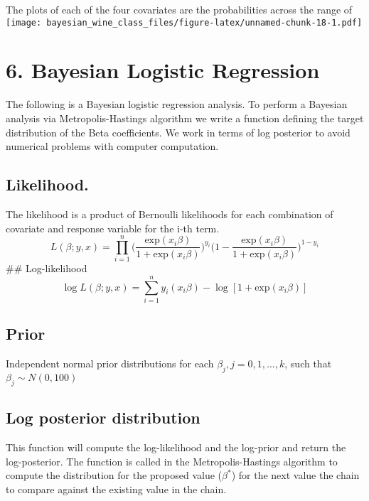 \documentclass[
]{article}
\begin{document}
The plots of each of the four covariates are the probabilities across
the range of
\texttt{[image: bayesian\_wine\_class\_files/figure-latex/unnamed-chunk-18-1.pdf]}

\hypertarget{bayesian-logistic-regression}{%
\section{6. Bayesian Logistic
Regression}\label{bayesian-logistic-regression}}

The following is a Bayesian logistic regression analysis. To perform a
Bayesian analysis via Metropolis-Hastings algorithm we write a function
defining the target distribution of the Beta coefficients. We work in
terms of log posterior to avoid numerical problems with computer
computation.

\hypertarget{likelihood.}{%
\subsection{Likelihood.}\label{likelihood.}}

The likelihood is a product of Bernoulli likelihoods for each
combination of covariate and response variable for the i-th term.
\[ L(\beta; y, x) = \prod_{i=1}^n \bigg(\frac{\text{exp}(x_i \beta)}{1 + \text{exp}(x_i \beta)}\bigg)^{y_i}\bigg(1- \frac{\text{exp}(x_i \beta)}{1 + \text{exp}(x_i \beta)}\bigg)^{1-y_i} \]
\#\# Log-likelihood
\[ \log L (\beta; y, x) = \sum_{i=1}^n y_i(x_i \beta) - \log [1 + \text{exp}(x_i \beta)] \]

\hypertarget{prior}{%
\subsection{Prior}\label{prior}}

Independent normal prior distributions for each
\(\beta_j, j=0,1,\dots,k\), such that \(\beta_j \sim N(0, 100)\)

\hypertarget{log-posterior-distribution}{%
\subsection{Log posterior
distribution}\label{log-posterior-distribution}}

This function will compute the log-likelihood and the log-prior and
return the log-posterior. The function is called in the
Metropolis-Hastings algorithm to compute the distribution for the
proposed value (\(\beta^*\)) for the next value the chain to compare
against the existing value in the chain.
\end{document}
